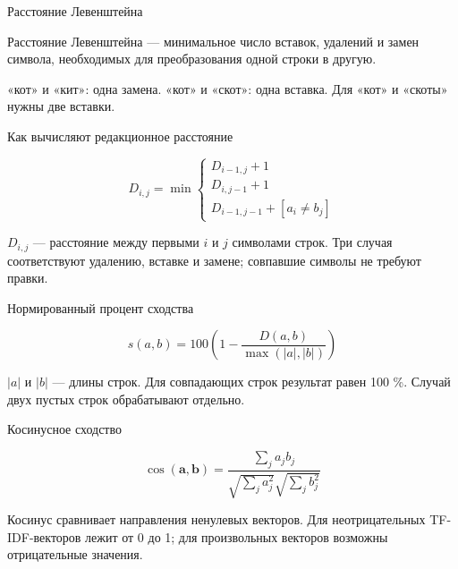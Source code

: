 \documentclass[aspectratio=169,12pt]{beamer}
\begin{document}
\begin{frame}{Расстояние Левенштейна}
\color{ink}
{\small Расстояние Левенштейна — минимальное число вставок, удалений и замен символа, необходимых для преобразования одной строки в другую.
\par\vspace{0.6em}«кот» и «кит»: одна замена. «кот» и «скот»: одна вставка. Для «кот» и «скоты» нужны две вставки.}
\end{frame}

\begin{frame}{Как вычисляют редакционное расстояние}
\color{ink}
{\small \[\displaystyle D_{i,j}=\min\begin{cases}D_{i-1,j}+1\\D_{i,j-1}+1\\D_{i-1,j-1}+[a_i\ne b_j]\end{cases}\]
\par\vspace{0.6em}$D_{i,j}$ — расстояние между первыми $i$ и $j$ символами строк. Три случая соответствуют удалению, вставке и замене; совпавшие символы не требуют правки.}
\end{frame}

\begin{frame}{Нормированный процент сходства}
\color{ink}
{\small \[\displaystyle s(a,b)=100\left(1-\frac{D(a,b)}{\max(|a|,|b|)}\right)\]
\par\vspace{0.6em}$|a|$ и $|b|$ — длины строк. Для совпадающих строк результат равен 100 \%. Случай двух пустых строк обрабатывают отдельно.}
\end{frame}



\begin{frame}{Косинусное сходство}
\color{ink}
{\small \[\displaystyle \cos(\mathbf a,\mathbf b)=\frac{\sum_j a_jb_j}{\sqrt{\sum_j a_j^2}\sqrt{\sum_j b_j^2}}\]
\par\vspace{0.6em}Косинус сравнивает направления ненулевых векторов. Для неотрицательных TF-IDF-векторов лежит от 0 до 1; для произвольных векторов возможны отрицательные значения.}
\end{frame}
\end{document}
